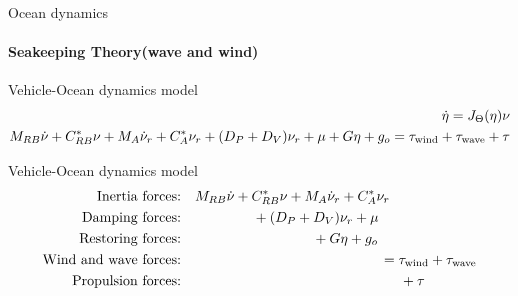


\begin{frame}{Ocean dynamics}
	\framesubtitle{Seakeeping Theory(wave and wind)}
	\begin{block}{Vehicle-Ocean dynamics model}
		\begin{align}
			\dot{\eta} = J_{\Theta}(\eta)\nu \notag \\
			M_{RB} \dot{\nu} + C_{RB}^* \nu + M_A \dot{\nu}_r + C_A^* \nu_r + (D_P + D_V) \nu_r + \mu + G \eta + g_o = \tau_{\text{wind}} + \tau_{\text{wave}}  + \tau  \notag
		\end{align}
	\end{block}
	\begin{block}{Vehicle-Ocean dynamics model}
		\begin{align}
			\text{Inertia forces:} & \quad M_{RB} \dot{\nu} + C_{RB}^* \nu + M_A \dot{\nu}_r + C_A^* \nu_r \notag\\
			\text{Damping forces:} & \hspace{1.8cm} + (D_P + D_V) \nu_r + \mu \notag\\
			\text{Restoring forces:} & \hspace{3.3cm} + G \eta + g_o \notag\\
			\text{Wind and wave forces:} & \hspace{5cm} = \tau_{\text{wind}} + \tau_{\text{wave}} \notag\\
			\text{Propulsion forces:} & \hspace{5.5cm} + \tau \notag
		\end{align}
	\end{block}
\end{frame}



